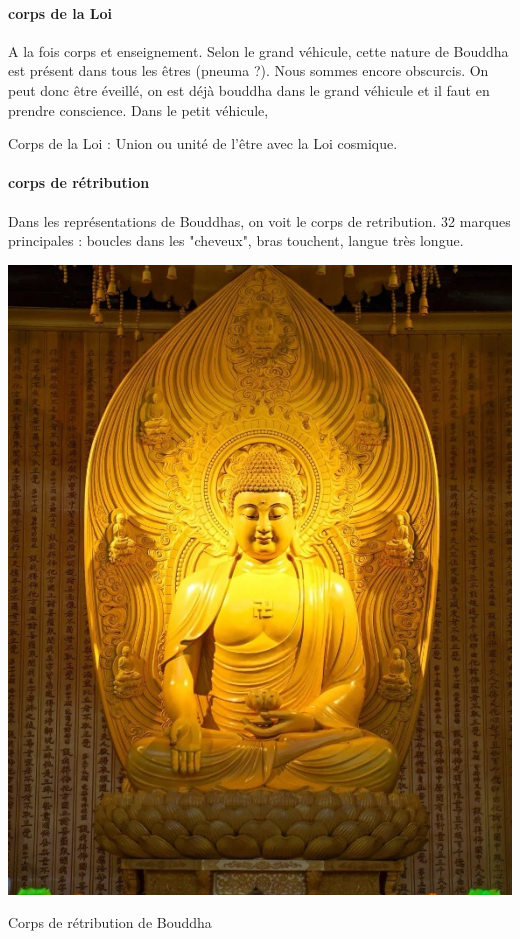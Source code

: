 \paragraph{corps de la Loi} A la fois corps et enseignement. Selon le grand véhicule, cette nature de Bouddha est présent dans tous les êtres (pneuma ?). Nous sommes encore obscurcis. On peut donc être éveillé, on est déjà bouddha dans le grand véhicule et il faut en prendre conscience. Dans le petit véhicule, 

Corps de la Loi : Union ou unité de l'être avec la Loi cosmique.


\paragraph{corps de rétribution} Dans les représentations de Bouddhas, on voit le corps de retribution. 32 marques principales : boucles dans les "cheveux", bras touchent, langue très longue.


\begin{marginfigure}
    \centering
    \includegraphics[width=\textwidth]{ConfucianismeTaoismeBouddhismeChinois/Images/bouddha.jpg}
    \caption{Corps de rétribution de Bouddha}
    \label{fig:enter-label}
\end{marginfigure}

